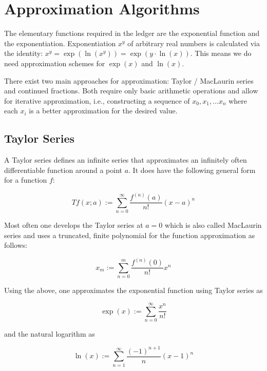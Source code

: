 \documentclass[11pt,a4paper,dvipsnames]{article}
\theoremstyle{definition}
\theoremstyle{definition}
\begin{document}
\section{Approximation Algorithms}
\label{sec:algorithms}

The elementary functions required in the ledger are the exponential function and
the exponentiation. Exponentiation $x^{y}$ of arbitrary real numbers is
calculated via the identity: $x^{y}= \exp({\ln(x^{y})}) = \exp(y\cdot
\ln(x))$. This means we do need approximation schemes for $\exp(x)$ and
$\ln(x)$.

There exist two main approaches for approximation: Taylor / MacLaurin series and
continued fractions. Both require only basic arithmetic operations and allow for
iterative approximation, i.e., constructing a sequence of $x_{0},x_{1},\ldots
x_{n}$ where each $x_{i}$ is a better approximation for the desired value.

\subsection{Taylor Series}
\label{sec:taylor-series}

A Taylor series defines an infinite series that approximates an infinitely often
differentiable function around a point $a$. It does have the following general
form for a function $f$:

\begin{equation*}
  Tf(x; a) := \sum_{n=0}^{\infty}\frac{f^{(n)}(a)}{n!}
  {\left(
    x - a
  \right)}^{n}
\end{equation*}

Most often one develops the Taylor series at $a=0$ which is also called
MacLaurin series and uses a truncated, finite polynomial for the function
approximation as follows:

\begin{equation*}
  x_{m} := \sum_{n=0}^{m}\frac{f^{(n)}(0)}{n!} x^{n}
\end{equation*}

Using the above, one approximates the exponential function using Taylor series
as

\begin{equation*}
  \exp(x) := \sum_{n=0}^{\infty}\frac{x^{n}}{n!}
\end{equation*}

and the natural logarithm as

\begin{equation*}
  \ln(x) := \sum_{n=1}^{\infty}\frac{(-1)^{n+1}}{n}
    {\left(
        x - 1
    \right)}^{n}
\end{equation*}
\end{document}

